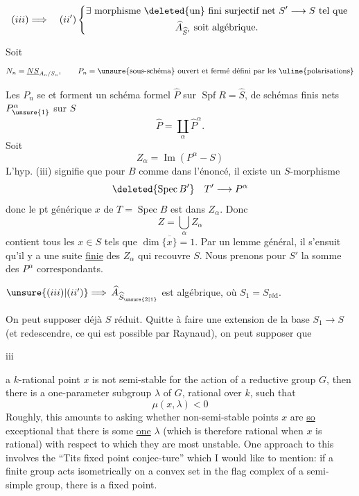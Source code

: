 

\[
(iii)\Longrightarrow\quad (ii')\left\{\begin{gathered}\exists\text{ morphisme }\deleted{\text{un}}\text{ fini surjectif net }S'\longrightarrow S\text{ tel que}\\ \widehat A_{\widehat S'}\text{ soit algébrique.}\end{gathered}\right.
\]

Soit 
\[
N_n=\underline{NS}_{A_n/S_n},\qquad P_n=\text{\unsure{sous-schéma} ouvert et fermé défini par les \uline{polarisations}}
\]

Les $P_n$ se  et forment un schéma formel $\widehat P$ sur $\operatorname{Spf}R=\widehat S$,   de schémas finis nets $P^\alpha_{\unsure{1}}$ sur $S$
\[
\widehat P=\coprod_\alpha\widehat P^\alpha.
\]
Soit
\[
Z_\alpha=\operatorname{Im}(P^\alpha\mathbin{-}S)
\]
L'hyp. (iii) signifie que pour $B$ comme dans l'énoncé, il existe un  $S$-morphisme
\[
\deleted{\operatorname{Spec}B'}\quad T'\longrightarrow P^\alpha
\]
donc le pt générique $x$ de $T=\operatorname{Spec}B$ est dans $Z_\alpha$.
Donc
\[
Z=\bigcup_\alpha Z_\alpha
\]
contient tous les $x\in S$ tels que $\dim\overline{\{x\}}=1$.
Par un lemme général, il s'ensuit qu'il y a une suite \uline{finie} des $Z_\alpha$ qui recouvre $S$. Nous prenons pour $S'$ la somme des $P^\alpha$ correspondants.

$\unsure{(iii)|(ii')}\Longrightarrow$   $\widehat A_{\widehat S_{\unsure{2|1}}}$ est algébrique, où $S_1=S_{\mathrm{réd}}$.

On peut supposer déjà $S$ réduit. Quitte à faire une extension de la base $S_1\longrightarrow S$ (et redescendre,  ce qui est possible par Raynaud), on peut supposer que


\begin{center}iii\end{center}

a $k$-rational point $x$ is not semi-stable for the action of a reductive group $G$, then there is a one-parameter subgroup $\lambda$ of $G$, rational over $k$, such that
\[
\mu(x,\lambda)<0
\]
Roughly, this amounts to asking whether non-semi-stable points $x$ are \uline{so} exceptional that there is some \uline{one} $\lambda$ (which is therefore rational when $x$ is rational) with respect to which they are most unstable. One approach to this involves the ``Tits fixed point conjec-ture'' which I would like to mention: if a finite group acts isometrically on a convex set in the flag complex of a semi-simple group, there is a fixed point.

